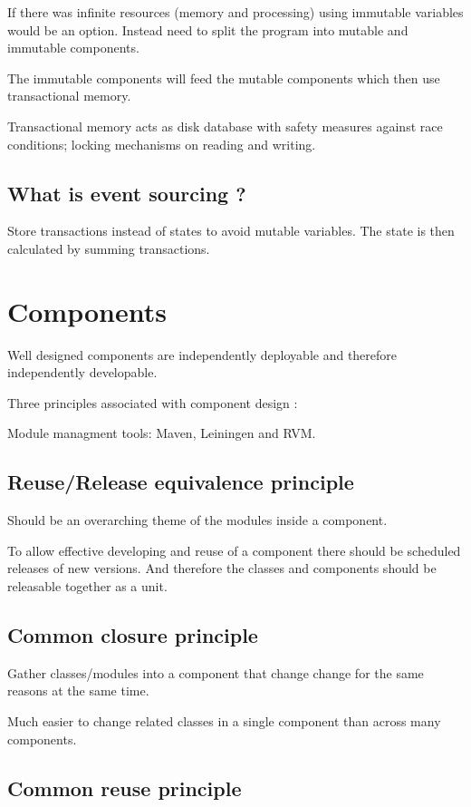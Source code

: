 \documentclass[11pt]{scrartcl} %
\begin{document}
If there was infinite resources (memory and processing) using immutable
variables would be an option. Instead need to split the program into
mutable and immutable components.

The immutable components will feed the mutable components which then use
transactional memory.


Transactional memory acts as disk database with safety measures against
race conditions; locking mechanisms on reading and writing.

\subsection{What is event sourcing ?}

Store transactions instead of states to avoid mutable variables. The
state is then calculated by summing transactions.

\section{Components}

Well designed components are independently deployable and therefore
independently developable.

Three principles associated with component design :

Module managment tools: Maven, Leiningen and RVM.

\subsection{Reuse/Release equivalence principle}

Should be an overarching theme of the modules inside a component.

To allow effective developing and reuse of a component there should be
scheduled releases of new versions. And therefore the classes and
components should be releasable together as a unit.

\subsection{Common closure principle}

Gather classes/modules into a component that change change for the same
reasons at the same time.

Much easier to change related classes in a single component than across
many components.

\subsection{Common reuse principle}
\end{document}

